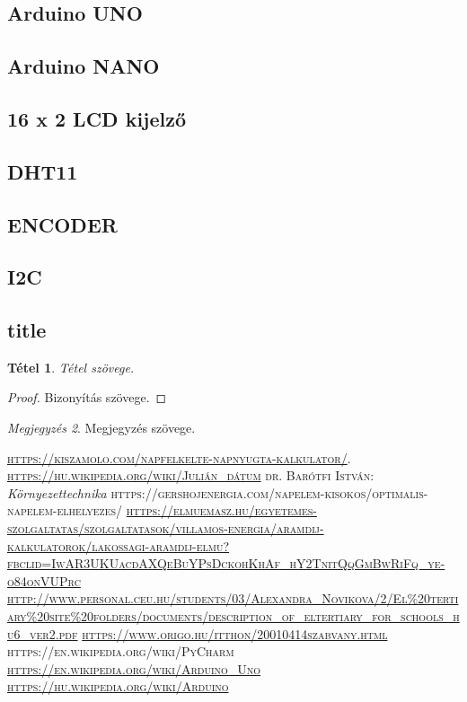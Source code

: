\documentclass[
]{thesis-ekf}
\newtheorem{tetel}{Tétel}[chapter]
\theoremstyle{definition}
\theoremstyle{remark}
\newtheorem{megjegyzes}[tetel]{Megjegyzés}
\begin{document}
		\subsection{Arduino UNO}
		\subsection{Arduino NANO}
		\subsection{16 x 2 LCD kijelző}
		\subsection{DHT11}		
		\subsection{ENCODER}
		\subsection{I2C}
		\subsection{title}

\begin{tetel}
Tétel szövege.
\end{tetel}

\begin{proof}
Bizonyítás szövege.
\end{proof}

\begin{megjegyzes}
Megjegyzés szövege.
\end{megjegyzes}

\begin{thebibliography}{2}
\textsc{\url{https://kiszamolo.com/napfelkelte-napnyugta-kalkulator/}}.
\textsc{\url{https://hu.wikipedia.org/wiki/Julián_dátum}}
\textsc{dr. Barótfi István}:  \emph{Környezettechnika}
\textsc{https://gershojenergia.com/napelem-kisokos/optimalis-napelem-elhelyezes/}
\textsc{\url{https://elmuemasz.hu/egyetemes-szolgaltatas/szolgaltatasok/villamos-energia/aramdij-kalkulatorok/lakossagi-aramdij-elmu?fbclid=IwAR3UKUacdAXQeBuYPsDckohKhAf_hY2TnitQqGmBwRiFq_ye-o84onVUPrc}}
\textsc{\url{http://www.personal.ceu.hu/students/03/Alexandra_Novikova/2/El\%20tertiary\%20site\%20folders/documents/description_of_eltertiary_for_schools_hu6_ver2.pdf}}
\textsc{\url{https://www.origo.hu/itthon/20010414szabvany.html}}
\textsc{https://en.wikipedia.org/wiki/PyCharm}
\textsc{\url{https://en.wikipedia.org/wiki/Arduino_Uno}}
\textsc{\url{https://hu.wikipedia.org/wiki/Arduino}}

\end{thebibliography}
\end{document}
